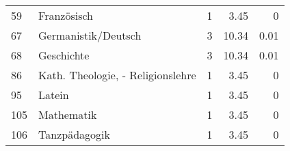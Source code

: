 \begin{longtable}{lXrrr}
     59 &
     \multicolumn{1}{X}{ Französisch   } &


       \num{1} &
       \num[round-mode=places,round-precision=2]{3.45} &
         \num[round-mode=places,round-precision=2]{0} \\

     67 &
     \multicolumn{1}{X}{ Germanistik/Deutsch   } &


       \num{3} &
       \num[round-mode=places,round-precision=2]{10.34} &
         \num[round-mode=places,round-precision=2]{0.01} \\

     68 &
     \multicolumn{1}{X}{ Geschichte   } &


       \num{3} &
       \num[round-mode=places,round-precision=2]{10.34} &
         \num[round-mode=places,round-precision=2]{0.01} \\

     86 &
     \multicolumn{1}{X}{ Kath. Theologie, - Religionslehre   } &


       \num{1} &
       \num[round-mode=places,round-precision=2]{3.45} &
         \num[round-mode=places,round-precision=2]{0} \\

     95 &
     \multicolumn{1}{X}{ Latein   } &


       \num{1} &
       \num[round-mode=places,round-precision=2]{3.45} &
         \num[round-mode=places,round-precision=2]{0} \\

     105 &
     \multicolumn{1}{X}{ Mathematik   } &


       \num{1} &
       \num[round-mode=places,round-precision=2]{3.45} &
         \num[round-mode=places,round-precision=2]{0} \\

     106 &
     \multicolumn{1}{X}{ Tanzpädagogik   } &


       \num{1} &
       \num[round-mode=places,round-precision=2]{3.45} &
         \num[round-mode=places,round-precision=2]{0} \\


\end{longtable}
